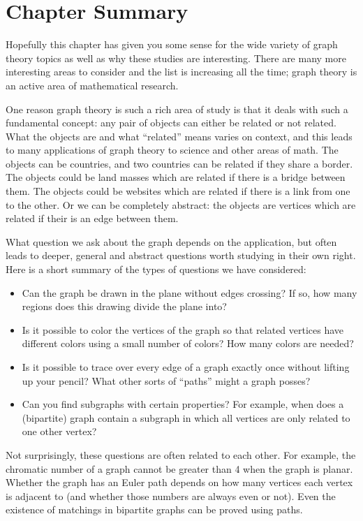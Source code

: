 \documentclass[12pt]{article}
\begin{document}
\section{Chapter Summary}

Hopefully this chapter has given you some sense for the wide variety of graph theory topics as well as why these studies are interesting.  There are many more interesting areas to consider and the list is increasing all the time; graph theory is an active area of mathematical research.

One reason graph theory is such a rich area of study is that it deals with such a fundamental concept: any pair of objects can either be related or not related.  What the objects are and what ``related'' means varies on context, and this leads to many applications of graph theory to science and other areas of math.  The objects can be countries, and two countries can be related if they share a border.  The objects could be land masses which are related if there is a bridge between them.  The objects could be websites which are related if there is a link from one to the other.  Or we can be completely abstract: the objects are vertices which are related if their is an edge between them.

What question we ask about the graph depends on the application, but often leads to deeper, general and abstract questions worth studying in their own right.  Here is a short summary of the types of questions we have considered:

\begin{itemize}
\item Can the graph be drawn in the plane without edges crossing?  If so, how many regions does this drawing divide the plane into?
\item Is it possible to color the vertices of the graph so that related vertices have different colors using a small number of colors?  How many colors are needed?
\item Is it possible to trace over every edge of a graph exactly once without lifting up your pencil?  What other sorts of ``paths'' might a graph posses?
\item Can you find subgraphs with certain properties?  For example, when does a (bipartite) graph contain a subgraph in which all vertices are only related to one other vertex?
\end{itemize}

Not surprisingly, these questions are often related to each other.  For example, the chromatic number of a graph cannot be greater than 4 when the graph is planar.  Whether the graph has an Euler path depends on how many vertices each vertex is adjacent to (and whether those numbers are always even or not).  Even the existence of matchings in bipartite graphs can be proved using paths.
\end{document}
